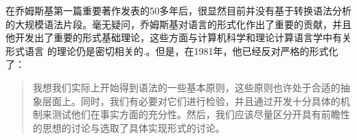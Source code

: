 
在乔姆斯基第一篇重要著作发表的50多年后，很显然目前并没有基于转换语法分析的大规模语法片段。毫无疑问，乔姆斯基对语言的形式化作出了重要的贡献，并且他开发出了重要的形式基础理论，这些方面与计算机科学和理论计算语言学中有关形式语言 的理论仍是密切相关的\citep{Chomsky59a-u}.。但是，在1981年，他已经反对严格的形式化了：
\begin{quote}
我想我们实际上开始得到语法的一些基本原则，这些原则也许处于合适的抽象层面上。同时，我们有必要对它们进行检验，并且通过开发十分具体的机制来测试他们在事实方面的充分性。然后，我们应该尽量区分开具有前瞻性的思想的讨论与选取了具体实现形式的讨论。\citep*[--3]{Chomsky81a}
\end{quote}
